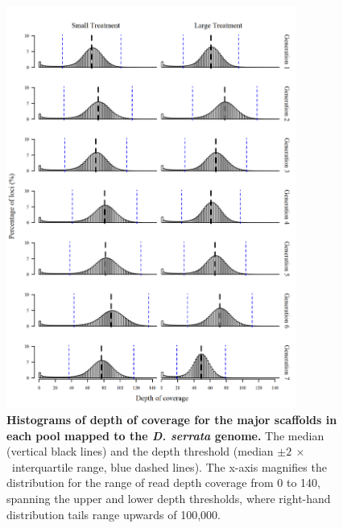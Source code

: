 \begin{figure}[!b]
    \centering
    \includegraphics[width=0.85\textwidth]{Supp/Chp4_DNA/Hist22.png}
\caption[Histograms of depth of coverage for the major scaffolds in each pool mapped to the \textit{D. serrata} genome.]{\textbf{Histograms of depth of coverage for the major scaffolds in each pool mapped to the \textit{D. serrata} genome.} The median (vertical black lines) and the depth threshold (median $\pm 2\ \times$~interquartile range, blue dashed lines). The x-axis magnifies the distribution for the range of read depth coverage from 0 to 140, spanning the upper and lower depth thresholds, where right-hand distribution tails range upwards of 100,000.}
    \label{fig:DNAsuppDepthHist}
\end{figure}

\FloatBarrier

